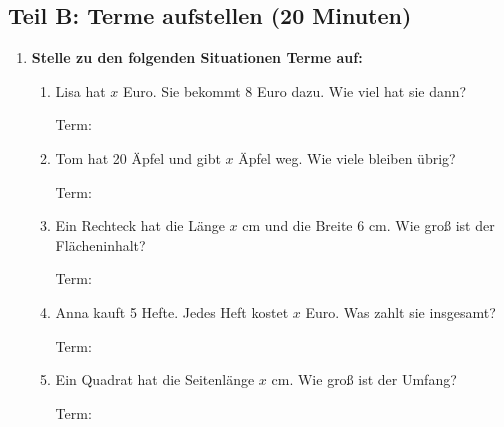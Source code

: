 \subsection*{Teil B: Terme aufstellen (20 Minuten)}

\begin{enumerate}[label=\arabic*.]
    \item \textbf{Stelle zu den folgenden Situationen Terme auf:}
    \vspace{0.5cm}

    \begin{enumerate}[label=\alph*)]
        \item Lisa hat $x$ Euro. Sie bekommt 8 Euro dazu. Wie viel hat sie dann?

        Term: \underline{\hspace{4cm}}

        \vspace{0.5cm}

        \item Tom hat 20 Äpfel und gibt $x$ Äpfel weg. Wie viele bleiben übrig?

        Term: \underline{\hspace{4cm}}

        \vspace{0.5cm}

        \item Ein Rechteck hat die Länge $x$ cm und die Breite 6 cm. Wie groß ist der Flächeninhalt?

        Term: \underline{\hspace{4cm}}

        \vspace{0.5cm}

        \item Anna kauft 5 Hefte. Jedes Heft kostet $x$ Euro. Was zahlt sie insgesamt?

        Term: \underline{\hspace{4cm}}

        \vspace{0.5cm}

        \item Ein Quadrat hat die Seitenlänge $x$ cm. Wie groß ist der Umfang?

        Term: \underline{\hspace{4cm}}
    \end{enumerate}

    \vspace{1cm}


\end{enumerate}
